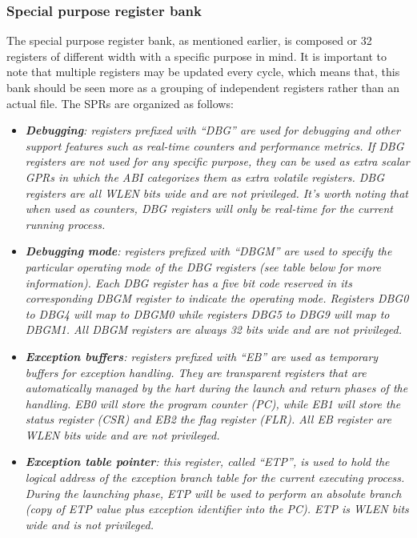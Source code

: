 \documentclass{article}
\begin{document}
            \subsubsection{Special purpose register bank}

                The special purpose register bank, as mentioned earlier, is composed or 32 registers of different width with a specific purpose in mind. It is important to note that multiple registers may be updated every cycle, which means that, this bank should be seen more as a grouping of independent registers rather than an actual file. The SPRs are organized as follows:

                \begin{itemize}

                    \item \textit{\textbf{Debugging}: registers prefixed with ``DBG'' are used for debugging and other support features such as real-time counters and performance metrics. If DBG registers are not used for any specific purpose, they can be used as extra scalar GPRs in which the ABI categorizes them as extra volatile registers. DBG registers are all WLEN bits wide and are not privileged. It's worth noting that when used as counters, DBG registers will only be real-time for the current running process.}

                    \item \textit{\textbf{Debugging mode}: registers prefixed with ``DBGM'' are used to specify the particular operating mode of the DBG registers (see table below for more information). Each DBG register has a five bit code reserved in its corresponding DBGM register to indicate the operating mode. Registers DBG0 to DBG4 will map to DBGM0 while registers DBG5 to DBG9 will map to DBGM1. All DBGM registers are always 32 bits wide and are not privileged.}

                    \item \textit{\textbf{Exception buffers}: registers prefixed with ``EB'' are used as temporary buffers for exception handling. They are transparent registers that are automatically managed by the hart during the launch and return phases of the handling. EB0 will store the program counter (PC), while EB1 will store the status register (CSR) and EB2 the flag register (FLR). All EB register are WLEN bits wide and are not privileged.}

                    \item \textit{\textbf{Exception table pointer}: this register, called ``ETP'', is used to hold the logical address of the exception branch table for the current executing process. During the launching phase, ETP will be used to perform an absolute branch (copy of ETP value plus exception identifier into the PC). ETP is WLEN bits wide and is not privileged.}


\end{itemize}
\end{document}
